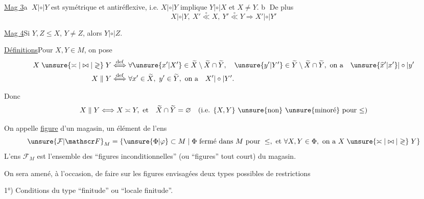 \uline{Mag 3}\quad\textcircled{a} $X|\circ|Y$ est symétrique et antiréflexive, i.e. $X|\circ|Y$ implique $Y|\circ|X$ et $X\ne Y$. \textcircled{b} De plus
\[
X|\circ|Y,\ X'\overset{\circ}{\ll}X,\ Y'\overset{\circ}{\ll}Y\Longrightarrow X'|\circ|Y'
\]

\uline{Mag 4}\quad Si $Y,Z\leq X$,  $Y\ne Z$, alors $Y|\circ|Z$.


\uline{Définitions}\quad Pour $X,Y\in M$, on pose
\[
\begin{aligned}
X\mathrel{\unsure{\asymp|\bowtie|\gtrless}}Y
&\overset{\mathrm{def}}{\Longleftrightarrow}
\forall\unsure{x'|X'}\in\widetilde X\setminus\widetilde X\cap\widetilde Y,\quad
\unsure{y'|Y'}\in\widetilde Y\setminus\widetilde X\cap\widetilde Y,\ \text{on a}\quad\unsure{\widehat{x}'|x'}|\circ|y'\\
X\parallel Y&\overset{\mathrm{def}}{\Longleftrightarrow}
\forall x'\in\widetilde X,\ y'\in\widetilde Y,\ \text{on a}\quad X'|\circ|Y'.
\end{aligned}
\]

Donc
\[
X\parallel Y\Longleftrightarrow X\asymp Y,\ \text{et}\quad\widetilde X\cap\widetilde Y=\varnothing
\quad\text{(i.e. $\{X,Y\}$ \unsure{non} \unsure{minoré} pour $\leq$)}
\]


On appelle \uline{figure}  d'un magasin, un élément de l'ens
\[
\unsure{\mathcal F|\mathscr F}_M=\{\unsure{\Phi|\varphi}\subset M\mid\Phi\ \text{fermé dans $M$ pour}\ \leq,\ \text{et}\ \forall X,Y\in\Phi,\ \text{on a}\ X\mathrel{\unsure{\asymp|\bowtie|\gtrless}}Y\}
\]
L'ens $\mathcal F_M$ est l'ensemble des ``figures inconditionnelles'' (ou ``figures'' tout court) du magasin.


On sera amené, à l'occasion, de faire sur les figures envisagées deux types possibles de restrictions

1°) Conditions du type ``finitude'' ou ``locale finitude''.

